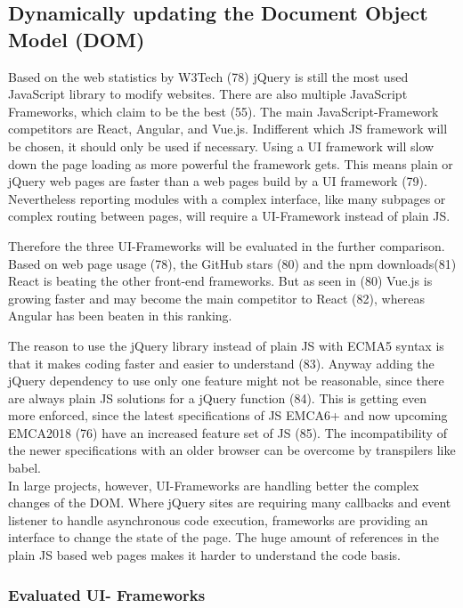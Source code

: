 \documentclass[american,a4paper,oneside,,tablecaptionabove]{scrbook}
\begin{document}
\subsection{Dynamically updating the Document Object Model
(DOM)}\label{dynamically-updating-the-document-object-model-dom}

Based on the web statistics by W3Tech (78) jQuery is still the most used
JavaScript library to modify websites. There are also multiple
JavaScript Frameworks, which claim to be the best (55). The main
JavaScript-Framework competitors are React, Angular, and Vue.js.
Indifferent which JS framework will be chosen, it should only be used if
necessary. Using a UI framework will slow down the page loading as more
powerful the framework gets. This means plain or jQuery web pages are
faster than a web pages build by a UI framework (79). Nevertheless
reporting modules with a complex interface, like many subpages or
complex routing between pages, will require a UI-Framework instead of
plain JS.

Therefore the three UI-Frameworks will be evaluated in the further
comparison. Based on web page usage (78), the GitHub stars (80) and the
npm downloads(81) React is beating the other front-end frameworks. But
as seen in (80) Vue.js is growing faster and may become the main
competitor to React (82), whereas Angular has been beaten in this
ranking.

The reason to use the jQuery library instead of plain JS with ECMA5
syntax is that it makes coding faster and easier to understand (83).
Anyway adding the jQuery dependency to use only one feature might not be
reasonable, since there are always plain JS solutions for a jQuery
function (84). This is getting even more enforced, since the latest
specifications of JS EMCA6+ and now upcoming EMCA2018 (76) have an
increased feature set of JS (85). The incompatibility of the newer
specifications with an older browser can be overcome by transpilers like
babel.\\
In large projects, however, UI-Frameworks are handling better the
complex changes of the DOM. Where jQuery sites are requiring many
callbacks and event listener to handle asynchronous code execution,
frameworks are providing an interface to change the state of the page.
The huge amount of references in the plain JS based web pages makes it
harder to understand the code basis.

\subsubsection{Evaluated UI- Frameworks}\label{evaluated-ui--frameworks}
\end{document}
